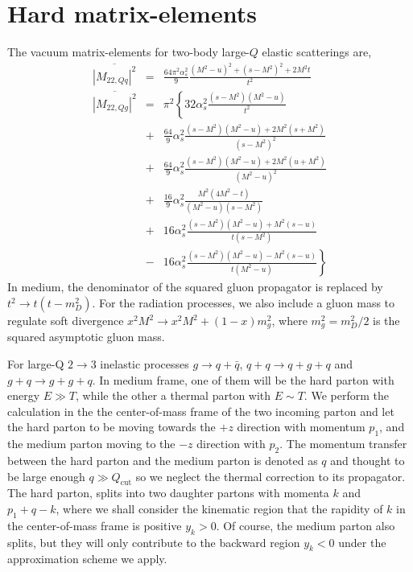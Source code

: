 \section{Hard matrix-elements}
The vacuum matrix-elements for two-body large-$Q$ elastic scatterings are,
\begin{eqnarray}
\overline{|M_{22,Qq}|^2} &=& \frac{64\pi^2\alpha_s^2}{9} \frac{(M^2-u)^2 + (s-M^2)^2 + 2 M^2 t}{t^2}
\nonumber
\\
\overline{|M_{22,Qg}|^2} &=& \pi^2 \left\{
32\alpha_s^2 \frac{(s-M^2)(M^2-u)}{t^2} \right.
\nonumber
\\
&+&\frac{64}{9}\alpha_s^2 \frac{(s-M^2)(M^2-u)+2M^2(s+M^2)}{(s-M^2)^2} \nonumber
\\
&+&\frac{64}{9}\alpha_s^2 \frac{(s-M^2)(M^2-u)+2M^2(u+M^2)}{(M^2-u)^2} \nonumber
\\
&+& \frac{16}{9}\alpha_s^2 \frac{M^2(4M^2 - t)}{(M^2-u)(s-M^2)} 
\nonumber
\\
&+& 16 \alpha_s^2 \frac{(s-M^2)(M^2-u)+M^2(s-u)}{t(s-M^2)}
\nonumber
\\
&-& \left. 16 \alpha_s^2 \frac{(s-M^2)(M^2-u)-M^2(s-u)}{t(M^2-u)}\right\}
\end{eqnarray}
In medium, the denominator of the squared gluon propagator is replaced by $t^2 \rightarrow t(t-m_D^2)$. 
For the radiation processes, we also include a gluon mass to regulate soft divergence $x^2M^2 \rightarrow x^2M^2 + (1-x)m_g^2$, where $m_g^2 = m_D^2/2$ is the squared asymptotic gluon mass. 

For large-Q $2\rightarrow 3$ inelastic processes $g\rightarrow q+\bar{q}$, $q+q\rightarrow q+g+q$ and $g+q\rightarrow g+g+q$.
In medium frame, one of them will be the hard parton with energy $E\gg T$, while the other a thermal parton with $E\sim T$.
We perform the calculation in the the center-of-mass frame of the two incoming parton and let the hard parton to be moving towards the $+z$ direction with momentum $p_1$, and the medium parton moving to the $-z$ direction with $p_2$.
The momentum transfer between the hard parton and the medium parton is denoted as $q$ and thought to be large enough $q\gg Q_{\textrm{cut}}$ so we neglect the thermal correction to its propagator.
The hard parton, splits into two daughter partons with momenta $k$ and $p_1 + q - k$, where we shall consider the kinematic region that the rapidity of $k$ in the center-of-mass frame is positive $y_k > 0$.
Of course, the medium parton also splits, but they will only contribute to the backward region $y_k<0$ under the approximation scheme we apply.


